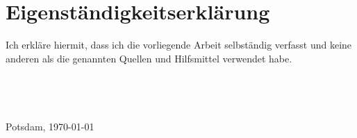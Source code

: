 \chapter*{Eigenständigkeitserklärung}
Ich erkläre hiermit, dass ich die vorliegende Arbeit selbständig verfasst und keine anderen als die genannten Quellen und Hilfsmittel verwendet habe.
\\
\\
\\
\\
\\
Potsdam, \today
\\
\\
\\
\\
\AUTHOR
